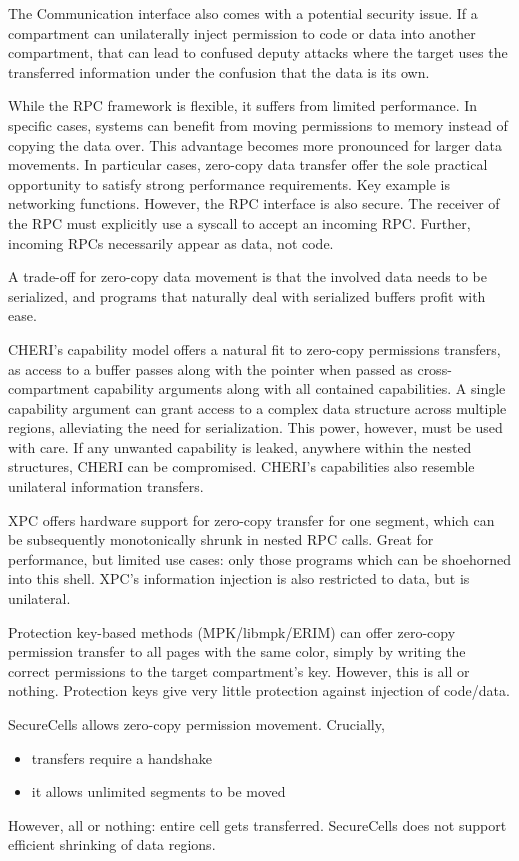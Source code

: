The Communication interface also comes with a potential security
issue.
If a compartment can unilaterally inject permission to code or data
into another compartment, that can lead to confused deputy attacks where
the target uses the transferred information under the confusion that the
data is its own. 

While the RPC framework is flexible, it suffers from limited performance.
In specific cases, systems can benefit from moving permissions to memory
instead of copying the data over.
This advantage becomes more pronounced for larger data movements.
In particular cases, zero-copy data transfer offer the sole practical
opportunity to satisfy strong performance requirements. 
Key example is networking functions.
However, the RPC interface is also secure. 
The receiver of the RPC must explicitly use a syscall to accept an 
incoming RPC.
Further, incoming RPCs necessarily appear as data, not code.

A trade-off for zero-copy data movement is that the involved data needs
to be serialized, and programs that naturally deal with serialized buffers
profit with ease.

CHERI's capability model offers a natural fit to zero-copy permissions 
transfers, as access to a buffer passes along with the pointer when passed
as cross-compartment capability arguments along with all contained 
capabilities.
A single capability argument can grant access to a complex data structure
across multiple regions, alleviating the need for serialization.
This power, however, must be used with care.
If any unwanted capability is leaked, anywhere within the nested structures,
CHERI can be compromised.
CHERI's capabilities also resemble unilateral information transfers.

XPC offers hardware support for zero-copy transfer for one segment, which can
be subsequently monotonically shrunk in nested RPC calls.
Great for performance, but limited use cases: only those programs which can
be shoehorned into this shell.
XPC's information injection is also restricted to data, but is unilateral.

Protection key-based methods (MPK/libmpk/ERIM) can offer zero-copy permission
transfer to all pages with the same color, simply by writing the correct
permissions to the target compartment's key.
However, this is all or nothing.
Protection keys give very little protection against injection of code/data.

SecureCells allows zero-copy permission movement. 
Crucially, 
\begin{itemize}
      \item transfers require a handshake
      \item it allows unlimited segments to be moved
\end{itemize}
However, all or nothing: entire cell gets transferred.
SecureCells does not support efficient shrinking of data regions.

